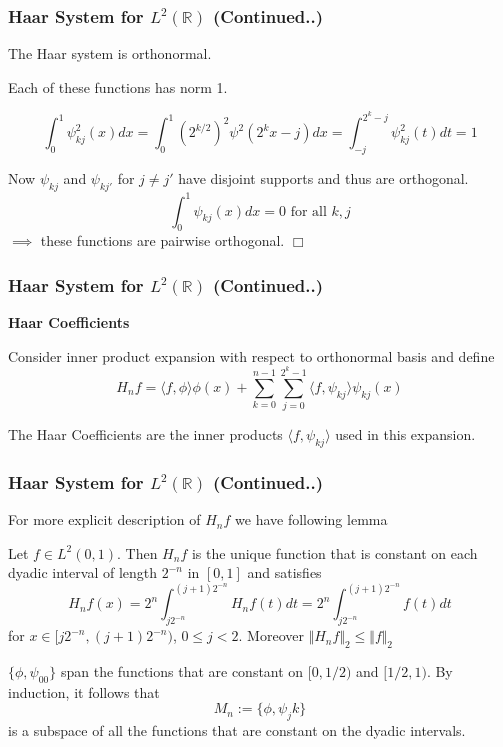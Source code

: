 \documentclass{beamer}
\newcommand{\qedwhite}{\hfill \ensuremath{\Box}}
\begin{document}
\begin{frame}
\frametitle{Haar System for  $L^2\left({\mathbb{R}}\right)$ (Continued..)}

\begin{lemma}[15.2.1]
    The Haar system is orthonormal.
\end{lemma}


Each of these functions has norm 1. 

$$\int_0^1\psi_{kj}^2(x)dx = \int_0^1 (2^{k/2})^2\psi^2(2^kx-j)dx = \int_{-j}^{2^k-j} \psi_{kj}^2(t)dt = 1$$


Now $\psi_{kj}$ and $\psi_{kj'}$ for $j \ne j'$ have disjoint supports and thus are orthogonal. 
$$\int_0^1\psi_{kj}(x)dx = 0 \text{ for all } k, j$$
$\implies$ these functions are pairwise orthogonal.
\qedwhite
\end{frame}

\begin{frame}
\frametitle{Haar System for  $L^2\left({\mathbb{R}}\right)$ (Continued..)}
\textbf{Haar Coefficients}
\linebreak

Consider inner product expansion with respect to orthonormal basis and define
    $$H_nf = \langle f, \phi\rangle \phi(x) + \sum_{k=0}^{n-1}  \sum_{j=0}^{2^k-1} \langle f, \psi_{kj}\rangle \psi_{kj}(x)$$

The Haar Coefficients are the inner products $\langle f, \psi_{kj}\rangle$ used in this expansion.
\end{frame}

\begin{frame}
    \frametitle{ Haar System for  $L^2\left({\mathbb{R}}\right)$ (Continued..)}
    For more explicit description of $H_nf$ we have following lemma
    \begin{lemma}[15.2.2]
        Let $f \in L^2(0,1)$. Then $H_nf$ is the unique function that is 
        constant on each dyadic interval of length $2^{-n}$ in $[0, 1]$ and satisfies
        $$H_nf(x) = 2^n\int_{j2^{-n}}^{(j+1)2^{-n}}H_nf(t)dt = 2^n\int_{j2^{-n}}^{(j+1)2^{-n}}f(t)dt$$
        for $x \in [j2^{-n}, (j+1)2^{-n})$, $0 \le j <  2$. Moreover $\Vert H_nf\Vert_2 \le \Vert f \Vert_2$
    \end{lemma}
$\{\phi, \psi_{00}\}$ span the functions that are constant on $[0, 1/2)$ and $[1/2, 1)$. By induction, it follows that
$$M_n := \{\phi, \psi_jk\}$$
is a subspace of all the functions that are constant on the dyadic intervals.

\end{frame}
\end{document}
